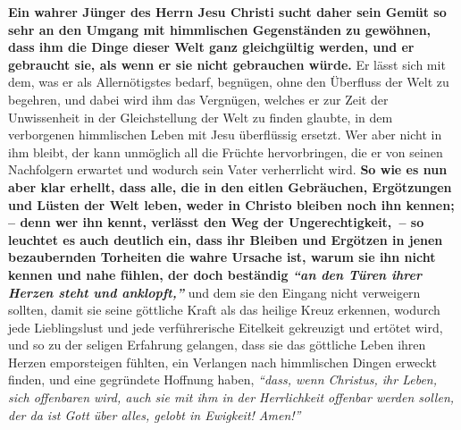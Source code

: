 \label{ref:16_05_weltliches}
\textbf{Ein wahrer Jünger des Herrn Jesu Christi sucht daher sein Gemüt so sehr
an den
Umgang mit himmlischen Gegenständen zu gewöhnen, dass ihm die Dinge dieser Welt
ganz gleichgültig werden, und er gebraucht sie, als wenn er sie nicht
gebrauchen würde.} Er lässt sich mit dem, was er als
Allernötigstes bedarf, begnügen, ohne
den Überfluss der Welt zu begehren,
und dabei wird ihm das
Vergnügen, welches er zur Zeit der Unwissenheit in der Gleichstellung der Welt
zu finden glaubte, in dem verborgenen himmlischen Leben mit Jesu überflüssig
ersetzt. Wer aber nicht in ihm bleibt, der kann unmöglich all die Früchte
hervorbringen, die er von seinen Nachfolgern erwartet und wodurch sein Vater
verherrlicht wird.
\label{ref:16_05_weltliches_2}
\textbf{So wie es nun aber klar erhellt,
dass alle, die in den eitlen Gebräuchen, Ergötzungen und Lüsten der Welt leben,
weder in Christo bleiben noch ihn kennen; -- denn wer ihn kennt, verlässt den
Weg der Ungerechtigkeit,~-- so leuchtet es auch deutlich ein, dass ihr Bleiben und
Ergötzen in jenen bezaubernden Torheiten die wahre Ursache ist, warum sie ihn
nicht kennen und nahe fühlen, der doch beständig
\textit{"`an den Türen ihrer Herzen
steht und anklopft,"'}}
und dem sie den Eingang nicht
verweigern sollten, damit sie seine göttliche Kraft als das heilige Kreuz
erkennen, wodurch jede Lieblingslust und jede verführerische Eitelkeit
gekreuzigt und ertötet wird, und so zu der seligen
Erfahrung gelangen, dass sie
das göttliche Leben ihren Herzen emporsteigen fühlten, ein Verlangen nach
himmlischen Dingen erweckt finden, und eine gegründete Hoffnung haben,
\textit{"`dass,
wenn Christus, ihr Leben, sich offenbaren wird, auch sie mit ihm in der
Herrlichkeit offenbar werden sollen, der da ist Gott über alles, gelobt in
Ewigkeit! Amen!"'}


